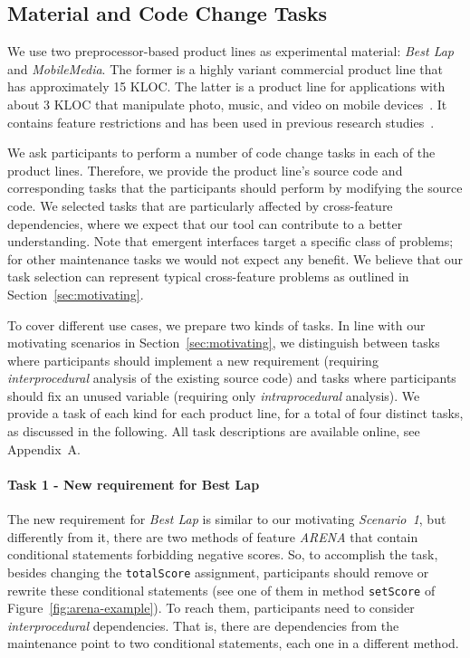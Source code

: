 \subsection{Material and Code Change Tasks}

We use two preprocessor-based product lines as experimental material: \textit{Best Lap} and \textit{MobileMedia}. The former is a highly variant commercial product line that has approximately 15 KLOC. The latter is a product line for applications with about 3 KLOC that manipulate photo, music, and video on mobile devices~\cite{eduardo-empirical-study-icse08}. It contains feature restrictions and has been used in previous research studies~\cite{eduardo-empirical-study-icse08, rashid-ao-mm}.

We ask participants to perform a number of code change tasks in each of the product lines. Therefore, we provide the product line's source code and corresponding tasks that the participants should perform by modifying the source code. We selected tasks that are particularly affected by cross-feature dependencies, where we expect that our tool can contribute to a better understanding. Note that emergent interfaces target a specific class of problems; for other maintenance tasks we would not expect any benefit. We believe that our task selection can represent typical cross-feature problems as outlined in Section~\ref{sec:motivating}.

To cover different use cases, we prepare two kinds of tasks. In line with our motivating scenarios in Section~\ref{sec:motivating}, we distinguish between tasks where participants should implement a new requirement (requiring \textit{interprocedural} analysis of the existing source code) and tasks where participants should fix an unused variable (requiring only \textit{intraprocedural} analysis). We provide a task of each kind for each product line, for a total of four distinct tasks, as discussed in the following. All task descriptions are available online, see Appendix~A.

\paragraph{Task 1 - New requirement for Best Lap}

The new requirement for \textit{Best Lap} is similar to our motivating \textit{Scenario~1}, but differently from it, there are two methods of feature \textit{ARENA} that contain conditional statements forbidding negative scores. So, to accomplish the task, besides changing the \texttt{totalScore} assignment, participants should remove or rewrite these conditional statements (see one of them in method \texttt{setScore} of Figure~\ref{fig:arena-example}). To reach them, participants need to consider \textit{interprocedural} dependencies. That is, there are dependencies from the maintenance point to two conditional statements, each one in a different method.

